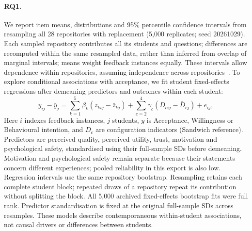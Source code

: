 \documentclass[runningheads]{llncs}
\begin{document}
\paragraph{RQ1.} We report item means, distributions and 95\% percentile confidence intervals from resampling all 28 repositories with replacement (5{,}000 replicates; seed 20261029). Each sampled repository contributes all its students and questions; differences are recomputed within the same resampled data, rather than inferred from overlap of marginal intervals; means weight feedback instances equally. These intervals allow dependence within repositories, assuming independence across repositories~\cite{cameron2015cluster}. To explore conditional associations with acceptance, we fit student fixed-effects regressions after demeaning predictors and outcomes within each student:
\begin{equation}
 y_{ij}-\bar y_j = \sum_{k=1}^{5}\beta_k(z_{kij}-\bar z_{kj}) + \sum_{c=2}^{4}\gamma_c(D_{cij}-\bar D_{cj}) + e_{ij},
 \label{eq:drivers}
\end{equation}
Here $i$ indexes feedback instances, $j$ students, $y$ is Acceptance, Willingness or Behavioural intention, and $D_c$ are configuration indicators (Sandwich reference). Predictors are perceived quality, perceived utility, trust, motivation and psychological safety, standardised using their full-sample SDs before demeaning. Motivation and psychological safety remain separate because their statements concern different experiences; pooled reliability in this export is also low. Regression intervals use the same repository bootstrap. Resampling retains each complete student block; repeated draws of a repository repeat its contribution without splitting the block. All 5,000 archived fixed-effects bootstrap fits were full rank. Predictor standardisation is fixed at the original full-sample SDs across resamples. These models describe contemporaneous within-student associations, not causal drivers or differences between students.
\end{document}
